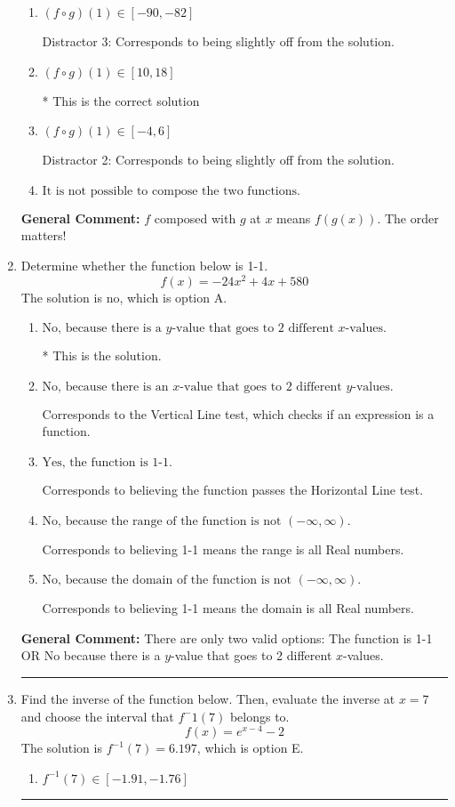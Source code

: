 \documentclass{extbook}[14pt]
\newcommand{\litem}[1]{\item #1

\rule{\textwidth}{0.4pt}}
\begin{document}
\begin{enumerate}
{\begin{enumerate}[label=\Alph*.]
 Distractor 1: Corresponds to reversing the composition.
\item \( (f \circ g)(1) \in [-90, -82] \)

 Distractor 3: Corresponds to being slightly off from the solution.
\item \( (f \circ g)(1) \in [10, 18] \)

* This is the correct solution
\item \( (f \circ g)(1) \in [-4, 6] \)

 Distractor 2: Corresponds to being slightly off from the solution.
\item \( \text{It is not possible to compose the two functions.} \)


\end{enumerate}

\textbf{General Comment:} $f$ composed with $g$ at $x$ means $f(g(x))$. The order matters!
}
\litem{
Determine whether the function below is 1-1.
\[ f(x) = -24 x^2 + 4 x + 580 \]The solution is \( \text{no} \), which is option A.\begin{enumerate}[label=\Alph*.]
\item \( \text{No, because there is a $y$-value that goes to 2 different $x$-values.} \)

* This is the solution.
\item \( \text{No, because there is an $x$-value that goes to 2 different $y$-values.} \)

Corresponds to the Vertical Line test, which checks if an expression is a function.
\item \( \text{Yes, the function is 1-1.} \)

Corresponds to believing the function passes the Horizontal Line test.
\item \( \text{No, because the range of the function is not $(-\infty, \infty)$.} \)

Corresponds to believing 1-1 means the range is all Real numbers.
\item \( \text{No, because the domain of the function is not $(-\infty, \infty)$.} \)

Corresponds to believing 1-1 means the domain is all Real numbers.
\end{enumerate}

\textbf{General Comment:} There are only two valid options: The function is 1-1 OR No because there is a $y$-value that goes to 2 different $x$-values.
}
\litem{
Find the inverse of the function below. Then, evaluate the inverse at $x = 7$ and choose the interval that $f^-1(7)$ belongs to.
\[ f(x) = e^{x-4}-2 \]The solution is \( f^{-1}(7) = 6.197 \), which is option E.\begin{enumerate}[label=\Alph*.]
\item \( f^{-1}(7) \in [-1.91, -1.76] \)


\end{enumerate}}
\end{enumerate}
\end{document}
